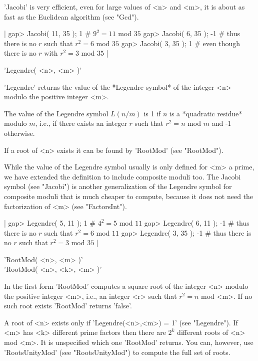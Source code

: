 'Jacobi' is very efficient, even for large values of <n> and <m>,  it  is
about as fast as the Euclidean algorithm (see "Gcd").

|    gap> Jacobi( 11, 35 );
    1         # $9^2 = 11$ mod $35$
    gap> Jacobi( 6, 35 );
    -1        # thus there is no $r$ such that $r^2 = 6$ mod $35$
    gap> Jacobi( 3, 35 );
    1         # even though there is no $r$ with $r^2 = 3$ mod $35$ |

%

'Legendre( <n>, <m> )'

'Legendre' returns the value of the *Legendre symbol*  of the integer <n>
modulo the positive integer <m>.

The value  of  the Legendre  symbol $L(n/m)$ is 1 if  $n$ is a *quadratic
residue* modulo $m$, i.e., if there exists an  integer $r$ such that $r^2
= n$ mod $m$ and -1 otherwise.

If a root of <n> exists it can be found by 'RootMod' (see "RootMod").

While the value of the Legendre symbol usually  is only defined for <m> a
prime, we have extended the  definition to include composite moduli  too.
The  Jacobi  symbol  (see "Jacobi")  is    another generalization  of the
Legendre symbol for composite moduli that is  much  cheaper  to  compute,
because it does not need the factorization of <m> (see "FactorsInt").

|    gap> Legendre( 5, 11 );
    1         # $4^2 = 5$ mod $11$
    gap> Legendre( 6, 11 );
    -1        # thus there is no $r$ such that $r^2 = 6$ mod $11$
    gap> Legendre( 3, 35 );
    -1        # thus there is no $r$ such that $r^2 = 3$ mod $35$ |

%
%

'RootMod( <n>, <m> )' \\
'RootMod( <n>, <k>, <m> )'

In the first  form 'RootMod'  computes a square  root of the  integer <n>
modulo the positive integer <m>, i.e., an integer <r> such that $r^2 = n$
mod <m>.  If no such root exists 'RootMod' returns 'false'.

A root of  <n> exists only if 'Legendre(<n>,<m>)  = 1' (see  "Legendre").
If <m> has  <k> different prime factors  then  there are $2^k$  different
roots of <n> mod  <m>.  It is  unspecified  which  one 'RootMod' returns.
You can, however, use  'RootsUnityMod' (see  "RootsUnityMod")  to compute
the full set of roots.

